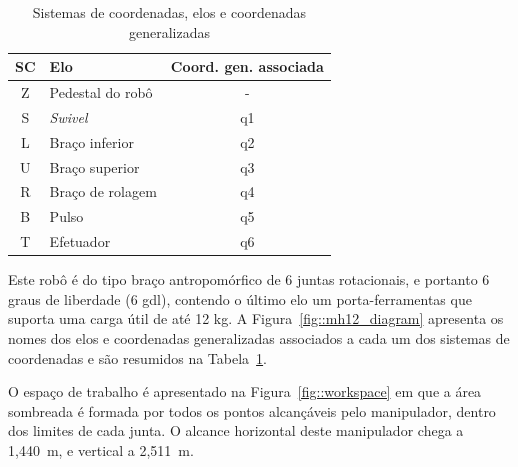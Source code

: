 \begin{table}[h]
\centering
\caption{Sistemas de coordenadas, elos e coordenadas generalizadas}
\label{tab::resumo_mh12}
\begin{tabular}{@{}clc@{}}
\toprule
SC & Elo              & \multicolumn{1}{l}{Coord. gen. associada} \\ \midrule
Z  & Pedestal do robô & -                                         \\
S  & \textit{Swivel}  & q1                                        \\
L  & Braço inferior   & q2                                        \\
U  & Braço superior   & q3                                        \\
R  & Braço de rolagem & q4                                        \\
B  & Pulso            & q5                                        \\
T  & Efetuador        & q6                                        \\ \bottomrule
\end{tabular}
\end{table}

Este robô é do tipo braço antropomórfico de 6 juntas rotacionais, e portanto 6
graus de liberdade (6 gdl), contendo o último elo um porta-ferramentas que
suporta uma carga útil de até 12 kg. A Figura~\ref{fig::mh12_diagram} apresenta
os nomes dos elos e coordenadas generalizadas associados a cada um dos sistemas
de coordenadas e são resumidos na Tabela~\ref{tab::resumo_mh12}.

O espaço de trabalho é apresentado na Figura~\ref{fig::workspace} em que a área
sombreada é formada por todos os pontos alcançáveis pelo manipulador, dentro dos
limites de cada junta. O alcance horizontal deste manipulador chega a 1,440~m, e
vertical a 2,511~m.


